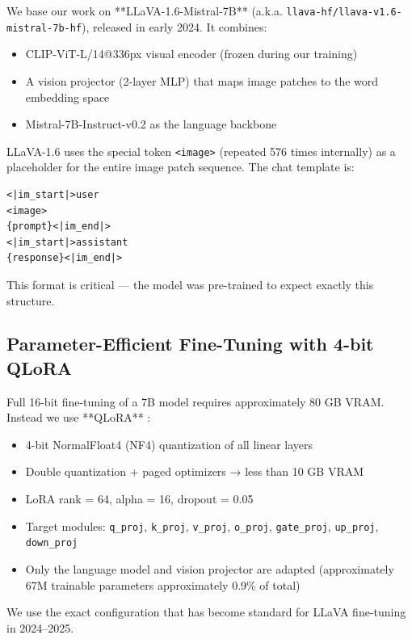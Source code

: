 \documentclass[11pt,a4paper]{article}
\begin{document}
We base our work on **LLaVA-1.6-Mistral-7B** \cite{liu2024llava} (a.k.a. \texttt{llava-hf/llava-v1.6-mistral-7b-hf}), released in early 2024. It combines:
\begin{itemize}
    \item CLIP-ViT-L/14@336px visual encoder (frozen during our training)
    \item A vision projector (2-layer MLP) that maps image patches to the word embedding space
    \item Mistral-7B-Instruct-v0.2 \cite{jiang2023mistral} as the language backbone
\end{itemize}

LLaVA-1.6 uses the special token \texttt{<image>} (repeated 576 times internally) as a placeholder for the entire image patch sequence. The chat template is:

\begin{verbatim}
<|im_start|>user
<image>
{prompt}<|im_end|>
<|im_start|>assistant
{response}<|im_end|>
\end{verbatim}

This format is critical — the model was pre-trained to expect exactly this structure.

\subsection{Parameter-Efficient Fine-Tuning with 4-bit QLoRA}

Full 16-bit fine-tuning of a 7B model requires approximately 80 GB VRAM. Instead we use **QLoRA** \cite{dettmers2024qlora}:

\begin{itemize}
    \item 4-bit NormalFloat4 (NF4) quantization of all linear layers
    \item Double quantization + paged optimizers → less than 10 GB VRAM
    \item LoRA rank = 64, alpha = 16, dropout = 0.05
    \item Target modules: \texttt{q_proj}, \texttt{k_proj}, \texttt{v_proj}, \texttt{o_proj}, \texttt{gate_proj}, \texttt{up_proj}, \texttt{down_proj}
    \item Only the language model and vision projector are adapted (approximately 67M trainable parameters approximately 0.9\% of total)
\end{itemize}

We use the exact configuration that has become standard for LLaVA fine-tuning in 2024–2025.
\end{document}
